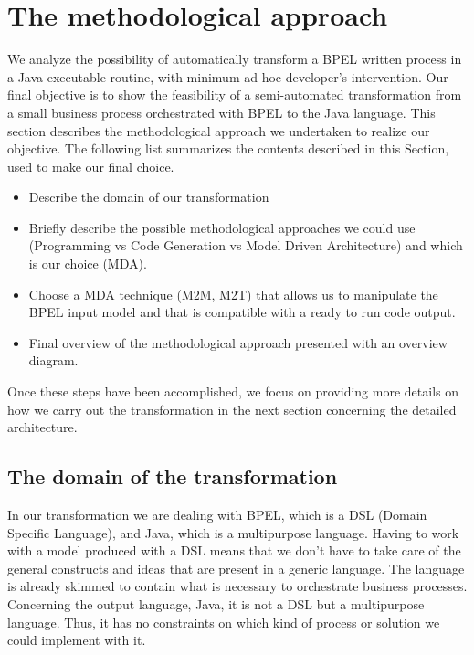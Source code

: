 \section{The methodological approach}
\label{MethodApproach}

We analyze the possibility of automatically transform a BPEL written process in a Java executable routine, with minimum ad-hoc developer’s intervention. Our final objective is to show the feasibility of a semi-automated transformation from a small business process orchestrated with BPEL to the Java language.
This section describes the methodological approach we undertaken to realize our objective. The following list summarizes the contents described in this Section, used to make our final choice.%

\begin{itemize}
 \item Describe the domain of our transformation
 \item Briefly describe the possible methodological approaches we could use (Programming vs Code Generation vs Model Driven Architecture) and which is our choice (MDA). 
 \item Choose a MDA technique (M2M, M2T) that allows us to manipulate the BPEL input model and that is compatible with a ready to run code output.
 \item Final overview of the methodological approach presented with an overview diagram.
\end{itemize}  

Once these steps have been accomplished, we focus on providing more details on how we carry out the transformation in the next section concerning the detailed architecture.


\subsection{The domain of the transformation} 
\label{sec:TransfDomain}
In our transformation we are dealing with BPEL, which is a DSL (Domain Specific Language), and Java, which is a multipurpose language. 
Having to work with a model produced with a DSL means that we don't have to take care of the general constructs and ideas that are present in a generic language. The language is already skimmed to contain what is necessary to orchestrate business processes.
Concerning the output language, Java, it is not a DSL but a multipurpose language. Thus, it has no constraints on which kind of process or solution we could implement with it. %

